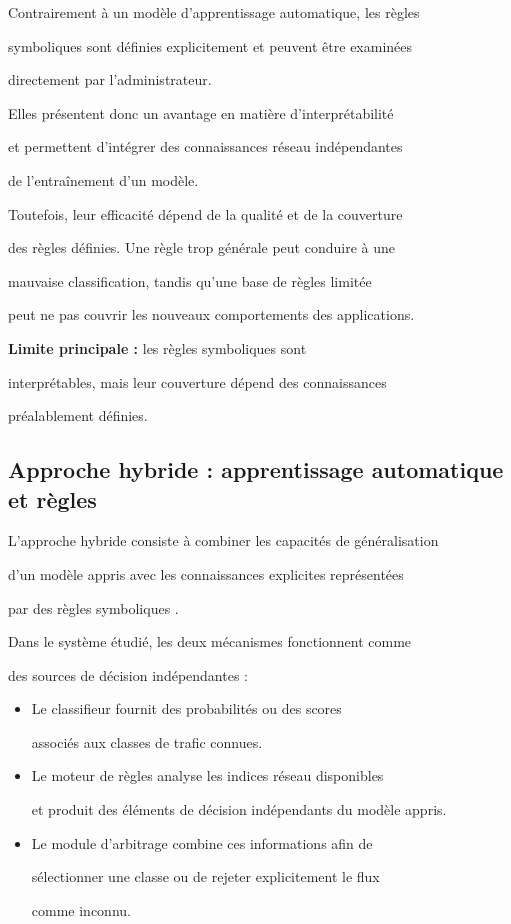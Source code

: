 Contrairement à un modèle d'apprentissage automatique, les règles

symboliques sont définies explicitement et peuvent être examinées

directement par l'administrateur.



Elles présentent donc un avantage en matière d'interprétabilité

et permettent d'intégrer des connaissances réseau indépendantes

de l'entraînement d'un modèle.



Toutefois, leur efficacité dépend de la qualité et de la couverture

des règles définies. Une règle trop générale peut conduire à une

mauvaise classification, tandis qu'une base de règles limitée

peut ne pas couvrir les nouveaux comportements des applications.



\textbf{Limite principale :} les règles symboliques sont

interprétables, mais leur couverture dépend des connaissances

préalablement définies.



\subsection{Approche hybride : apprentissage automatique et règles}



L'approche hybride consiste à combiner les capacités de généralisation

d'un modèle appris avec les connaissances explicites représentées

par des règles symboliques \cite{garcez2023}.



Dans le système étudié, les deux mécanismes fonctionnent comme

des sources de décision indépendantes :



\begin{itemize}

    \item Le classifieur fournit des probabilités ou des scores

    associés aux classes de trafic connues.

    \item Le moteur de règles analyse les indices réseau disponibles

    et produit des éléments de décision indépendants du modèle appris.

    \item Le module d'arbitrage combine ces informations afin de

    sélectionner une classe ou de rejeter explicitement le flux

    comme inconnu.

\end{itemize}



